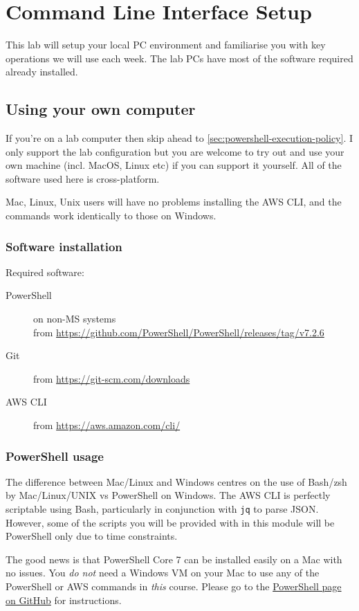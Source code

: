 \chapter{Command Line Interface Setup}


This lab will setup your local PC environment and familiarise you with key operations we will use each week.
The lab PCs have most of the software required already installed.

\section{Using your own computer}

If you're on a lab computer then skip ahead to \autoref{sec:powershell-execution-policy}.
I only support the lab configuration but you are welcome to try out and use your own machine (incl. MacOS, Linux etc) if you can support it yourself.
All of the software used here is cross-platform.

Mac, Linux, Unix users will have no problems installing the AWS CLI, and
the commands work identically to those on Windows.


\subsection{Software installation}

Required software:
\begin{description}
\item[PowerShell] on non-MS systems\\from \url{https://github.com/PowerShell/PowerShell/releases/tag/v7.2.6}
\item[Git] from \url{https://git-scm.com/downloads}
\item[AWS CLI] from \url{https://aws.amazon.com/cli/}
\end{description}

\subsection{PowerShell usage}

The difference between Mac/Linux and Windows centres on the use of
Bash/zsh by Mac/Linux/UNIX vs PowerShell on Windows. The AWS CLI is
perfectly scriptable using Bash, particularly in conjunction with
\texttt{jq} to parse JSON. However, some of the scripts you will be
provided with in this module will be PowerShell only due to time
constraints.

The good news is that PowerShell Core 7 can be installed easily on a Mac
with no issues. You \emph{do not} need a Windows VM on your Mac to use
any of the PowerShell or AWS commands in \emph{this} course. Please go
to the \href{https://github.com/PowerShell/PowerShell}{PowerShell page
on GitHub} for instructions.

